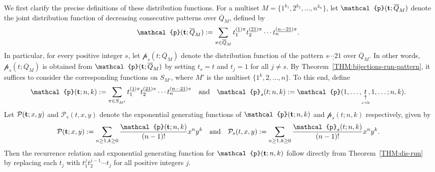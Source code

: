 \documentclass[11pt]{article}
\newcommand{\vt} { {\bf t}}
\numberwithin{equation}{section}
\def\cP{\mathcal{P}}
\def\oQ{\overline{Q}}
\newcommand{\cp}{\mathcal{p}}
\begin{document}
We first clarify the precise definitions of these distribution functions. For a multiset $M=\{1^{k_1},2^{k_2},\ldots,n^{k_n}\}$, let $\mathcal{p}(\vt;\oQ_M)$ denote the joint distribution function of decreasing consecutive patterns over $\oQ_M$, defined by
\[\cp(\vt;\oQ_M):=\sum_{\pi\in \oQ_M} t_1^{(\underline{1})\pi}t_2^{(\underline{21})\pi}\cdots t_n^{(\underline{n\cdots 21})\pi}. \]
In particular, for every positive integer $s$, let $\cp_s(t;\oQ_M)$ denote the distribution function of the pattern $\underline{s\cdots 21}$ over $\oQ_M$. In other words, $\cp_s(t;\oQ_M)$ is obtained from $\cp(\vt;\oQ_M)$ by setting $t_s=t$ and $t_j=1$ for all $j\neq s$. By Theorem~\ref{THM:bijections-run-pattern}, it suffices to consider the corresponding functions on $S_{M'}$, where $M'$ is the multiset $\{1^{k},2,\ldots,n\}$. To this end, define 
\[\cp(\vt;n,k):=\sum_{\pi\in S_{M'}} t_1^{(\underline{1})\pi}t_2^{(\underline{21})\pi}\cdots t_n^{(\underline{n\cdots 21})\pi}\quad\text{and}\quad 
\cp_s(t;n,k):=\cp(1,\ldots,\mkern-3mu\underset{\underset{s\text{-th}}{\uparrow}}{t}\mkern-4mu,1,\ldots;n,k). \]
Let $\cP(\vt;x,y)$ and $\cP_s(t,x,y)$ denote the exponential generating functions of $\cp(\vt;n,k)$ and $\cp_s(t;n,k)$ respectively, given by
\[\cP(\vt;x,y):=\sum_{n\geq1,k\geq0}\frac{\cp(\vt;n,k)}{(n-1)!}x^n y^k
\quad\text{and}\quad
\cP_s(t,x,y):=\sum_{n\geq1,k\geq0}\frac{\cp_s(t;n,k)}{(n-1)!}x^n y^k.\]
Then the recurrence relation and exponential generating function for $\cp(\vt;n,k)$ follow directly from Theorem~\ref{THM:dis-run} by replacing each $t_j$ with $t_1^j t_2^{j-1}\cdots t_j$ for all positive integers $j$.
\end{document}
